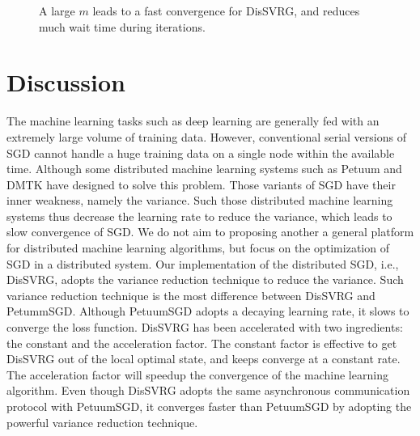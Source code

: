 \documentclass[preprint,review,11pt,a4paper]{elsarticle}
\begin{document}
\begin{figure}
\centering
{}
\caption{A large $m$ leads to a fast convergence for DisSVRG, and reduces much wait time during iterations.}
\label{figure_evaluation_random_strategy}
\end{figure}

\section{Discussion}
\label{discussion}
The machine learning tasks such as deep learning are generally fed with an extremely large volume of training data. However, conventional serial versions of SGD  cannot handle a huge training data on a single node within the available time. Although some distributed machine learning systems such as Petuum \cite{Xing:2015ib} and DMTK\cite{Yuan:2015ka} have designed to solve this problem.  Those variants of SGD have their inner weakness, namely the variance. Such those distributed machine learning systems thus decrease the learning rate to reduce the variance, which leads to slow convergence of SGD. We do not aim to proposing another a general platform for distributed machine learning algorithms, but focus on the optimization of SGD in a distributed system. Our implementation of the distributed SGD, i.e., DisSVRG, adopts the variance reduction technique to reduce the variance. Such variance reduction technique is the most difference between DisSVRG and PetummSGD. Although PetuumSGD  adopts a decaying learning rate, it slows to converge the loss function. DisSVRG has been accelerated with two ingredients: the constant and the acceleration factor. The constant factor is effective to get DisSVRG out of the local optimal state, and keeps converge at a constant rate. The acceleration factor will speedup the convergence of the machine learning algorithm. Even though DisSVRG adopts the same asynchronous communication protocol with PetuumSGD, it converges faster than PetuumSGD by adopting the powerful variance reduction technique.
\end{document}
